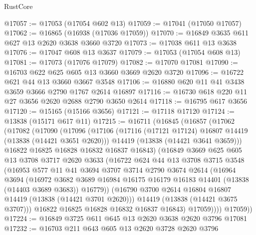 \begin{lexlean}{RustCore}
\begin{coremodule}
@17057 := @17053 (@17054 @602 @13)
@17059 := @17041 (@17050 @17057)
@17062 := @16865 (@16938 (@17036 @17059))
@17070 := @16849 @3635 @611 @627 @13 @2620 @3638 @3660 @3720
@17073 := @17038 @611 @13 @3638
@17076 := @17047 @608 @13 @3637
@17079 := @17053 (@17054 @608 @13)
@17081 := @17073 (@17076 @17079)
@17082 := @17070 @17081
@17090 := @16703 @622 @625 @605 @13 @3660 @3669 @2620 @3720
@17096 := @16722 @621 @44 @13 @3660 @3667 @3548
@17106 := @16880 @620 @11 @41 @3438 @3659 @3666 @2790 @1767 @2614 @16897
@17116 := @16730 @618 @220 @11 @27 @3656 @2620 @2688 @2790 @3650 @2614
@17118 := @16795 @617 @3656
@17120 := @15165 (@15166 @3656)
@17121 := @17118 @17120
@17124 := @13838 (@15171 @617 @11)
@17215 := @16711
    (@16845
      (@16857
        (@17062
          (@17082
            (@17090
              (@17096
                (@17106
                  (@17116 (@17121 @17124) @16807 @14419 (@13838 (@14421 @3651 @2620)))
                  @14419
                  (@13838 (@14421 @3641 @3659)))
                @16822
                @16825
                @16828
                @16832
                @16837
                @16843)
              (@16849
                @3669
                @625
                @605
                @13
                @3708
                @3717
                @2620
                @3633
                (@16722
                  @624
                  @44
                  @13
                  @3708
                  @3715
                  @3548
                  (@16953
                    @577
                    @11
                    @41
                    @3694
                    @3707
                    @3714
                    @2790
                    @3674
                    @2614
                    (@16964
                      @3694
                      (@16972
                        @3682
                        @3689
                        @16984
                        @16175
                        @16179
                        @16183
                        @14401
                        (@13838 (@14403 @3689 @3683))
                        @16779))
                    (@16790 @3700 @2614 @16804 @16807 @14419 (@13838 (@14421 @3701 @2620)))
                    @14419
                    (@13838 (@14421 @3675 @3707)))
                  @16822
                  @16825
                  @16828
                  @16832
                  @16837
                  @16843)
                @17059))))
        @17059))
@17224 := @16849 @3725 @611 @645 @13 @2620 @3638 @2620 @3796 @17081
@17232 := @16703 @211 @643 @605 @13 @2620 @3728 @2620 @3796

\end{coremodule}
\end{lexlean}
